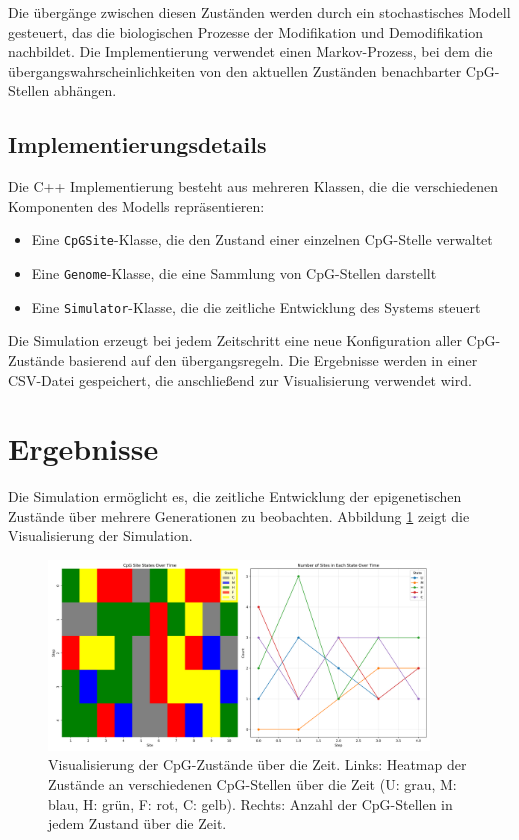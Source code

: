 \documentclass{SeminarV2}
\begin{document}
Die {\"u}berg{\"a}nge zwischen diesen Zust{\"a}nden werden durch ein stochastisches Modell gesteuert, das die biologischen Prozesse der Modifikation und Demodifikation nachbildet. Die Implementierung verwendet einen Markov-Prozess, bei dem die {\"u}bergangswahrscheinlichkeiten von den aktuellen Zust{\"a}nden benachbarter CpG-Stellen abh{\"a}ngen.

\subsection{Implementierungsdetails}
Die C++ Implementierung besteht aus mehreren Klassen, die die verschiedenen Komponenten des Modells repr{\"a}sentieren:
\begin{itemize}
    \item Eine \texttt{CpGSite}-Klasse, die den Zustand einer einzelnen CpG-Stelle verwaltet
    \item Eine \texttt{Genome}-Klasse, die eine Sammlung von CpG-Stellen darstellt
    \item Eine \texttt{Simulator}-Klasse, die die zeitliche Entwicklung des Systems steuert
\end{itemize}

Die Simulation erzeugt bei jedem Zeitschritt eine neue Konfiguration aller CpG-Zust{\"a}nde basierend auf den {\"u}bergangsregeln. Die Ergebnisse werden in einer CSV-Datei gespeichert, die anschlie{\ss}end zur Visualisierung verwendet wird.

\section{Ergebnisse}
Die Simulation erm{\"o}glicht es, die zeitliche Entwicklung der epigenetischen Zust{\"a}nde {\"u}ber mehrere Generationen zu beobachten. Abbildung \ref{fig:cpg_states} zeigt die Visualisierung der Simulation.

\begin{figure}[htbp]
    \centering
    \includegraphics[width=0.9\textwidth]{cpg_states_plot.png}
    \caption{Visualisierung der CpG-Zust{\"a}nde {\"u}ber die Zeit. Links: Heatmap der Zust{\"a}nde an verschiedenen CpG-Stellen {\"u}ber die Zeit (U: grau, M: blau, H: gr{\"u}n, F: rot, C: gelb). Rechts: Anzahl der CpG-Stellen in jedem Zustand {\"u}ber die Zeit.}
    \label{fig:cpg_states}
\end{figure}
\end{document}
